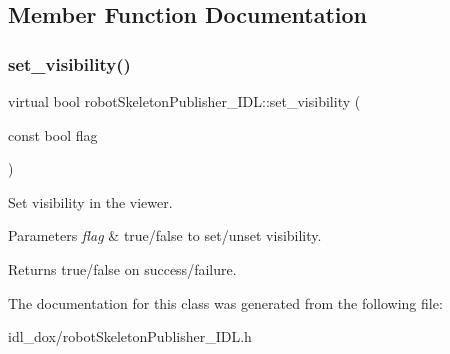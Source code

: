 \subsection{Member Function Documentation}
\mbox{\label{classrobotSkeletonPublisher__IDL_a4484695feff9f11dc7d773fe9a473612}} 
\subsubsection{\texorpdfstring{set\+\_\+visibility()}{set\_visibility()}}
{\footnotesize\ttfamily virtual bool robot\+Skeleton\+Publisher\+\_\+\+I\+D\+L\+::set\+\_\+visibility (\begin{DoxyParamCaption}\item[{const bool}]{flag }\end{DoxyParamCaption})\hspace{0.3cm}{\ttfamily [virtual]}}



Set visibility in the viewer. 


\begin{DoxyParams}{Parameters}
{\em flag} & true/false to set/unset visibility. \\
\hline
\end{DoxyParams}
\begin{DoxyReturn}{Returns}
true/false on success/failure. 
\end{DoxyReturn}


The documentation for this class was generated from the following file\+:\begin{DoxyCompactItemize}
\item 
idl\+\_\+dox/robot\+Skeleton\+Publisher\+\_\+\+I\+D\+L.\+h\end{DoxyCompactItemize}
